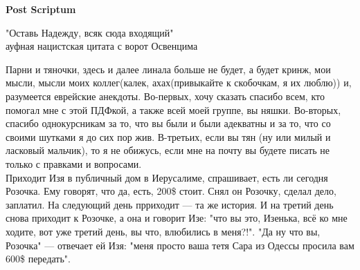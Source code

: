 \newpage
\begin{center}
    \textbf{Post Scriptum}
\end{center}
\begin{flushright}
    "Оставь Надежду, всяк сюда входящий"\\
    ауфная нацистская цитата с ворот Освенцима 
\end{flushright}

Парни и тяночки, здесь и далее линала больше не будет, а будет кринж, мои мысли, мысли моих коллег(калек, ахах(привыкайте к скобочкам, я их люблю)) и, разумеется еврейские анекдоты. Во-первых, хочу сказать спасибо всем, кто помогал мне с этой ПДФкой, а также всей моей группе, вы няшки. Во-вторых, спасибо однокурсникам за то, что вы были и были адекватны и за то, что со своими шутками я до сих пор жив. В-третьих, если вы тян (ну или милый и ласковый мальчик), то я не обижусь, если мне на почту вы будете писать не только с правками и вопросами.\\

Приходит Изя в публичный дом в Иерусалиме, спрашивает, есть ли сегодня Розочка. Ему говорят, что да, есть, 200\$ стоит. Снял он Розочку, сделал дело, заплатил. На следующий день прриходит --- та же история. И на третий день снова приходит к Розочке, а она и говорит Изе: "что вы это, Изенька, всё ко мне ходите, вот уже третий день, вы что, влюбились в меня?!". "Да ну что вы, Розочка" --- отвечает ей Изя: "меня просто ваша тетя Сара из Одессы просила вам 600\$ передать". 
